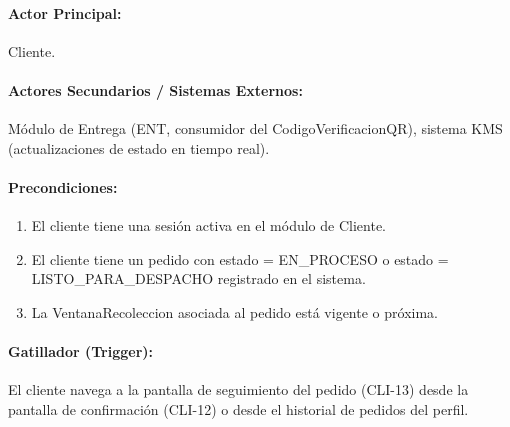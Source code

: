 \paragraph{Actor Principal:} Cliente.

\paragraph{Actores Secundarios / Sistemas Externos:} Módulo de Entrega (ENT, consumidor del CodigoVerificacionQR), sistema KMS (actualizaciones de estado en tiempo real).

\paragraph{Precondiciones:}
\begin{enumerate}
    \item[I.] El cliente tiene una sesión activa en el módulo de Cliente.
    \item[II.] El cliente tiene un pedido con estado = EN\_PROCESO o estado = LISTO\_PARA\_DESPACHO registrado en el sistema.
    \item[III.] La VentanaRecoleccion asociada al pedido está vigente o próxima.
\end{enumerate}

\paragraph{Gatillador (Trigger):} El cliente navega a la pantalla de seguimiento del pedido (CLI-13) desde la pantalla de confirmación (CLI-12) o desde el historial de pedidos del perfil.


